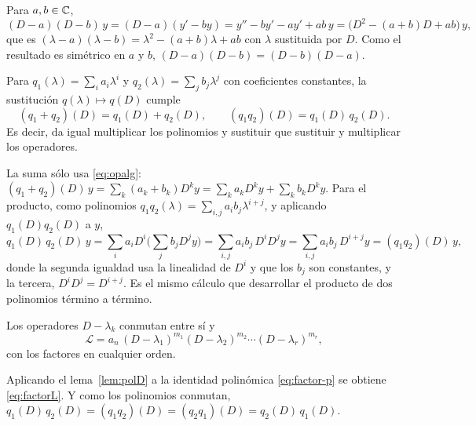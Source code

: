 \documentclass[11pt,twoside]{article}
\newcommand\Lop{\mathcal L}
\begin{document}
\begin{ejemplo}\label{ej:dosfactores}
Para $a,b\in\mathbb{C}$,
\begin{equation*}
(D-a)(D-b)\,y=(D-a)(y'-by)=y''-by'-ay'+ab\,y=\big(D^2-(a+b)D+ab\big)\,y,
\end{equation*}
que es $(\lambda-a)(\lambda-b)=\lambda^2-(a+b)\lambda+ab$ con $\lambda$ sustituida por $D$. Como el resultado es simétrico en
$a$ y $b$, $(D-a)(D-b)=(D-b)(D-a)$.
\end{ejemplo}

\begin{lema}[Polinomios en $D$]\label{lem:polD}
Para $q_1(\lambda)=\sum_ia_i\lambda^i$ y $q_2(\lambda)=\sum_jb_j\lambda^j$ con coeficientes constantes, la sustitución
$q(\lambda)\mapsto q(D)$ cumple
\begin{equation}\label{eq:polD}
(q_1+q_2)(D)=q_1(D)+q_2(D),\qquad(q_1q_2)(D)=q_1(D)\,q_2(D).
\end{equation}
Es decir, da igual multiplicar los polinomios y sustituir que sustituir y multiplicar los operadores.
\end{lema}

\begin{demostracion}
La suma sólo usa \eqref{eq:opalg}: $(q_1+q_2)(D)\,y=\sum_k(a_k+b_k)D^ky=\sum_ka_kD^ky+\sum_kb_kD^ky$. Para el producto,
como polinomios $q_1q_2(\lambda)=\sum_{i,j}a_ib_j\lambda^{i+j}$, y aplicando $q_1(D)q_2(D)$ a $y$,
\begin{equation*}
q_1(D)\,q_2(D)\,y=\sum_ia_iD^i\Big(\sum_jb_jD^jy\Big)=\sum_{i,j}a_ib_j\,D^iD^jy=\sum_{i,j}a_ib_j\,D^{i+j}y=(q_1q_2)(D)\,y,
\end{equation*}
donde la segunda igualdad usa la linealidad de $D^i$ y que los $b_j$ son constantes, y la tercera, $D^iD^j=D^{i+j}$. Es el
mismo cálculo que desarrollar el producto de dos polinomios término a término.
\end{demostracion}

\begin{proposicion}[Factorización de $\Lop$]\label{prop:factorL}
Los operadores $D-\lambda_k$ conmutan entre sí y
\begin{equation}\label{eq:factorL}
\Lop=a_n\,(D-\lambda_1)^{m_1}(D-\lambda_2)^{m_2}\cdots(D-\lambda_r)^{m_r},
\end{equation}
con los factores en cualquier orden.
\end{proposicion}

\begin{demostracion}
Aplicando el lema~\ref{lem:polD} a la identidad polinómica \eqref{eq:factor-p} se obtiene \eqref{eq:factorL}. Y como los
polinomios conmutan, $q_1(D)\,q_2(D)=(q_1q_2)(D)=(q_2q_1)(D)=q_2(D)\,q_1(D)$.
\end{demostracion}
\end{document}
